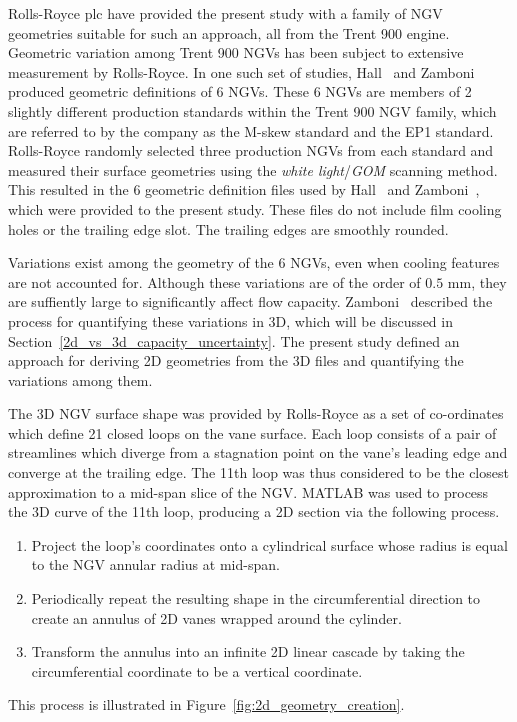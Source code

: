 \documentclass[a4paper, 11pt, oneside]{report}
\begin{document}
Rolls-Royce plc have provided the present study with a family of NGV geometries suitable for such an approach, all from the Trent 900 engine. Geometric variation among Trent 900 NGVs has been subject to extensive measurement by Rolls-Royce. In one such set of studies, Hall~\cite{hall_area} and Zamboni~\cite{zamboni_area} produced geometric definitions of 6 NGVs. These 6 NGVs are members of 2 slightly different production standards within the Trent 900 NGV family, which are referred to by the company as the M-skew standard and the EP1 standard. Rolls-Royce randomly selected three production NGVs from each standard and measured their surface geometries using the \textit{white light}/\textit{GOM} scanning method. This resulted in the 6 geometric definition files used by Hall~\cite{hall_area} and Zamboni~\cite{zamboni_area}, which were provided to the present study. These files do not include film cooling holes or the trailing edge slot. The trailing edges are smoothly rounded.

Variations exist among the geometry of the 6 NGVs, even when cooling features are not accounted for. Although these variations are of the order of $0.5$ mm, they are suffiently large to significantly affect flow capacity. Zamboni~\cite{zamboni_area} described the process for quantifying these variations in 3D, which will be discussed in Section~\ref{2d_vs_3d_capacity_uncertainty}. The present study defined an approach for deriving 2D geometries from the 3D files and quantifying the variations among them.

The 3D NGV surface shape was provided by Rolls-Royce as a set of co-ordinates which define 21 closed loops on the vane surface. Each loop consists of a pair of streamlines which diverge from a stagnation point on the vane's leading edge and converge at the trailing edge. The 11th loop was thus considered to be the closest approximation to a mid-span slice of the NGV. MATLAB was used to process the 3D curve of the 11th loop, producing a 2D section via the following process. 
\begin{enumerate}
  \item Project the loop's coordinates onto a cylindrical surface whose radius is equal to the NGV annular radius at mid-span.
  \item Periodically repeat the resulting shape in the circumferential direction to create an annulus of 2D vanes wrapped around the cylinder.
  \item Transform the annulus into an infinite 2D linear cascade by taking the circumferential coordinate to be a vertical coordinate.
\end{enumerate}
This process is illustrated in Figure~\ref{fig:2d_geometry_creation}.
\end{document}
